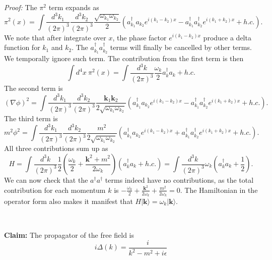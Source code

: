 \documentclass[aps,prb,superscriptaddress,nofootinbib]{revtex4}
\begin{document}
\noindent\textit{Proof:}
The $\pi^2$ term expands as
\begin{equation}
	\pi^2(x) = \int \frac{d^{3} k_1}{(2\pi)^{3}} \frac{d^{3} k_2}{(2\pi)^{3}}
		\frac{\sqrt{\omega_{k_1} \omega_{k_2}}}{2} \left(a^\dagger_{k_1}a_{k_2}e^{i(k_1-k_2)x} - a^\dagger_{k_1} a^\dagger_{k_2} e^{i(k_1+k_2)x} + h.c.\right).
\end{equation}
We note that after integrate over $x$, the phase factor $e^{i(k_1-k_2)x}$ produce a delta function for $k_1$ and $k_2$.
The $a^\dagger_{k_1} a^\dagger_{k_2}$ terms will finally be cancelled by other terms.
We temporally ignore such term.
The contribution from the first term is then
\begin{equation}
	\int d^4 x\ \pi^2(x) = \int \frac{d^3 k}{(2\pi)^3} \frac{\omega_k}{2} a_k^\dagger a_k + h.c.
\end{equation}
The second term is
\begin{equation}
	(\nabla \phi)^2 = \int \frac{d^{3} k_1}{(2\pi)^{3}} \frac{d^{3} k_2}{(2\pi)^{3}}
		\frac{\bm k_1 \bm k_2}{2\sqrt{\omega_{k_1}\omega_{k_2}}} \left(a^\dagger_{k_1}a_{k_2}e^{i(k_1-k_2)x} - a^\dagger_{k_1} a^\dagger_{k_2} e^{i(k_1+k_2)x} + h.c.\right).
\end{equation}
The third term is
\begin{equation}
	m^2 \phi^2 = \int \frac{d^{3} k_1}{(2\pi)^{3}} \frac{d^{3} k_2}{(2\pi)^{3}}
		\frac{m^2}{2\sqrt{\omega_{k_1}\omega_{k_2}}} \left(a^\dagger_{k_1}a_{k_2}e^{i(k_1-k_2)x} + a^\dagger_{k_1} a^\dagger_{k_2} e^{i(k_1+k_2)x} + h.c.\right).
\end{equation}
All three contributions sum up as
\begin{equation}
	H = \int \frac{d^3 k}{(2\pi)^3} \frac{1}{2}\left(\frac{\omega_k}{2} + \frac{\bm k^2+m^2}{2 \omega_k}\right) \left(a_k^\dagger a_k + h.c. \right) 
	= \int \frac{d^3 k}{(2\pi)^3} \omega_k \left(a_k^\dagger a_k +\frac{1}{2} \right).
\end{equation}
We can now check that the $a^\dagger a^\dagger$ terms indeed have no contributions, as the total contribution for each momentum $k$ is $-\frac{\omega_k}{2} + \frac{\bm k^2}{2\omega_k} + \frac{m^2}{2\omega_k} = 0$.
The Hamiltonian in the operator form also makes it manifest that $H |\bm k\rangle = \omega_k |\bm k\rangle$.

\

\noindent\textbf{Claim:}
The propagator of the free field is
\begin{equation}
	i\Delta(k) = \frac{i}{k^2-m^2+i\epsilon}
\end{equation}
\end{document}
